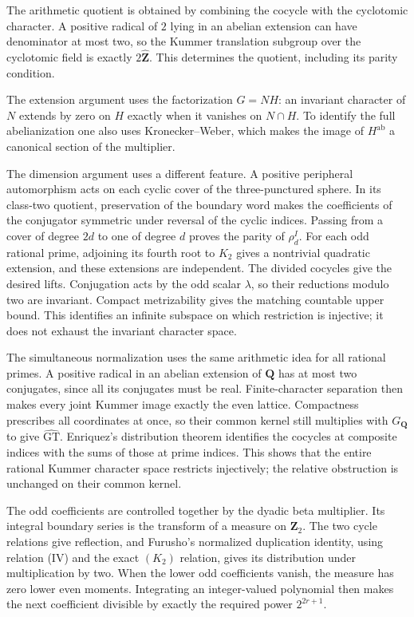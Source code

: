 \documentclass[11pt,a4paper]{article}
\theoremstyle{definition}
\theoremstyle{remark}
\newcommand{\GT}{\widehat{\mathrm{GT}}}
\newcommand{\Zh}{\widehat{\mathbf Z}}
\newcommand{\Q}{\mathbf Q}
\newcommand{\ab}{\mathrm{ab}}
\begin{document}
The arithmetic quotient is obtained by combining the cocycle with the cyclotomic character. A positive radical of $2$ lying in an abelian extension can have denominator at most two, so the Kummer translation subgroup over the cyclotomic field is exactly $2\Zh$. This determines the quotient, including its parity condition.

The extension argument uses the factorization $G=NH$: an invariant character of $N$ extends by zero on $H$ exactly when it vanishes on $N\cap H$. To identify the full abelianization one also uses Kronecker--Weber, which makes the image of $H^{\ab}$ a canonical section of the multiplier.

The dimension argument uses a different feature. A positive peripheral automorphism acts on each cyclic cover of the three-punctured sphere. In its class-two quotient, preservation of the boundary word makes the coefficients of the conjugator symmetric under reversal of the cyclic indices. Passing from a cover of degree $2d$ to one of degree $d$ proves the parity of $\rho_d^I$. For each odd rational prime, adjoining its fourth root to $K_2$ gives a nontrivial quadratic extension, and these extensions are independent. The divided cocycles give the desired lifts. Conjugation acts by the odd scalar $\lambda$, so their reductions modulo two are invariant. Compact metrizability gives the matching countable upper bound. This identifies an infinite subspace on which restriction is injective; it does not exhaust the invariant character space.

The simultaneous normalization uses the same arithmetic idea for all rational primes. A positive radical in an abelian extension of $\Q$ has at most two conjugates, since all its conjugates must be real. Finite-character separation then makes every joint Kummer image exactly the even lattice. Compactness prescribes all coordinates at once, so their common kernel still multiplies with $G_\Q$ to give $\GT$. Enriquez's distribution theorem identifies the cocycles at composite indices with the sums of those at prime indices. This shows that the entire rational Kummer character space restricts injectively; the relative obstruction is unchanged on their common kernel.

The odd coefficients are controlled together by the dyadic beta
multiplier. Its integral boundary series is the transform of a measure on
$\mathbf Z_2$. The two cycle relations give reflection, and Furusho's
normalized duplication identity, using relation (IV) and the exact
$(K_2)$ relation, gives its distribution under multiplication by two.
When the lower odd coefficients vanish, the measure has zero lower even
moments. Integrating an integer-valued polynomial then makes the next
coefficient divisible by exactly the required power $2^{2r+1}$.
\end{document}

